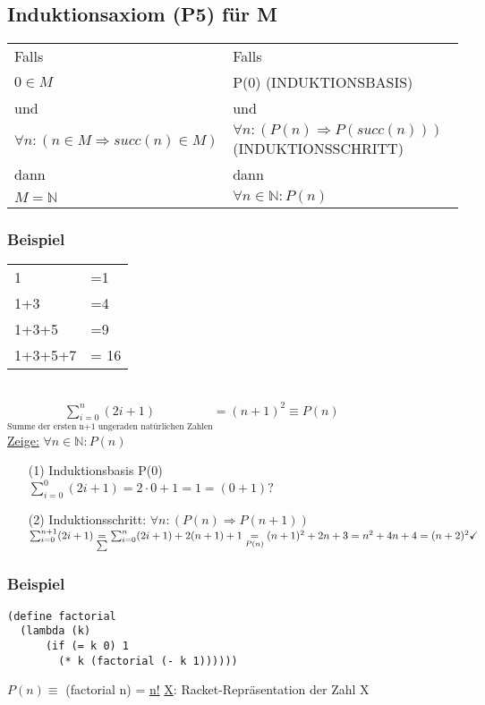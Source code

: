 \documentclass[a4paper,12pt]{article}
\begin{document}
\subsection{Induktionsaxiom (P5) für M}
\begin{tabular}{l|l|}
Falls \hfil & Falls \hfil \\
$0 \in M$ & P(0) (INDUKTIONSBASIS)\\
und & und \\
$\forall n:(n \in M \Rightarrow succ(n)\in M)$ & $\forall n:(P(n)\Rightarrow P(succ(n)))$ (INDUKTIONSSCHRITT)\\
dann & dann \\
$M=\mathbb{N}$ & $\forall n \in \mathbb{N}:P(n)$
\end{tabular}
\subsubsection{Beispiel}
\begin{tabular}{ll}
1 & =1\\
1+3 & =4\\
1+3+5 & =9\\
1+3+5+7 & = 16\\
\end{tabular}\\
$\underset{\text{Summe der ersten n+1 ungeraden natürlichen Zahlen}}{\sum_{i=0}^{n} (2i+1)} = (n+1)^2 \equiv P(n)$\\

\uline{Zeige:} $\forall n \in \mathbb{N}: P(n)$
\begin{itemize}
\item[(1)] Induktionsbasis P(0)\\
$\sum_{i=0}^{0} (2i+1) = 2\cdot 0 + 1 = 1 = (0+1)? $\checkmark \\
\item[(2)] Induktionsschritt: $\forall n: (P(n) \Rightarrow P (n+1))$\\
$\sum_{i=0}^{n+1} (2i+1) \underset{\sum}{=} \sum_{i=0}^{n} (2i+1) + 2(n+1)+1\\
\underset{P(n)}{=} (n+1)^2 +2n+3\\
= n^2 + 4n +4 \\
= (n+2)^2 \checkmark $\\
\end{itemize}
\subsubsection{Beispiel}
\begin{lstlisting}[style=customc]
(define factorial
  (lambda (k)
      (if (= k 0) 1
        (* k (factorial (- k 1))))))
\end{lstlisting}
$P(n)\equiv$ (factorial n) = \uline{n!} \hfil \uline{X}: Racket-Repräsentation der Zahl X\\
\end{document}

